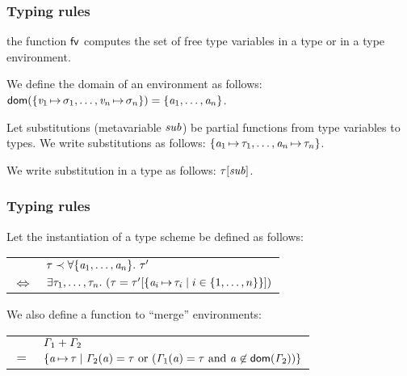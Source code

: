 \documentclass[12pt,red]{beamer}
\begin{document}
\begin{frame}
  \frametitle{Typing rules}

  the function $\mathsf{fv}$ computes the set of free type variables in
  a type or in a type environment.

  \vspace{0.1in}

  We define the domain of an environment as follows:
  $\mathsf{dom}(\{\mathit{v}_1\,{\mapsto}\,\mathit{\sigma}_1,\dots,\mathit{v}_n\,{\mapsto}\,\mathit{\sigma}_n\})
  =\{\mathit{a}_1,\dots,\mathit{a}_n\}$.

  \vspace{0.1in}

  Let substitutions (metavariable $\mathit{sub}$) be partial functions
  from type variables to types.  We write substitutions as follows:
  $\{\mathit{a}_1\,{\mapsto}\,\mathit{\tau}_1,\dots,\mathit{a}_n\,{\mapsto}\,\mathit{\tau}_n\}$.

  \vspace{0.1in}

  We write substitution in a type as follows:
  $\mathit{\tau}[\mathit{sub}]$.
\end{frame}


\begin{frame}
  \frametitle{Typing rules}

  Let the instantiation of a type scheme be defined as follows:
  \begin{center}
    \begin{tabular}{ll}
      & $\mathit{\tau} \prec \forall\{\mathit{a}_1,\dots,\mathit{a}_n\}.\ \mathit{\tau}'$
      \\
      $\iff$
      &
      $\exists\mathit{\tau}_1,\dots,\mathit{\tau}_n.\ 
        (\mathit{\tau}
        =\mathit{\tau}'[\{\mathit{a}_i\,{\mapsto}\,\mathit{\tau}_i\mid{i}\in\{1,\dots,n\}\}])
     $
    \end{tabular}
  \end{center}

  \vspace{0.1in}

  We also define a function to ``merge'' environments:
  \begin{center}
    \begin{tabular}{ll}
      & $\mathit{\Gamma}_1+\mathit{\Gamma}_2$
      \\
      $=$
      &
      $\{\mathit{a}\,{\mapsto}\,\mathit{\tau}
      \mid
      \mathit{\Gamma}_2(\mathit{a})=\mathit{\tau}
      \mbox{ or }
      (\mathit{\Gamma}_1(\mathit{a})=\mathit{\tau}
      \mbox{  and }\mathit{a}\not\in\mathsf{dom}(\mathit{\Gamma}_2))
      \}$
    \end{tabular}
  \end{center}
\end{frame}
\end{document}
